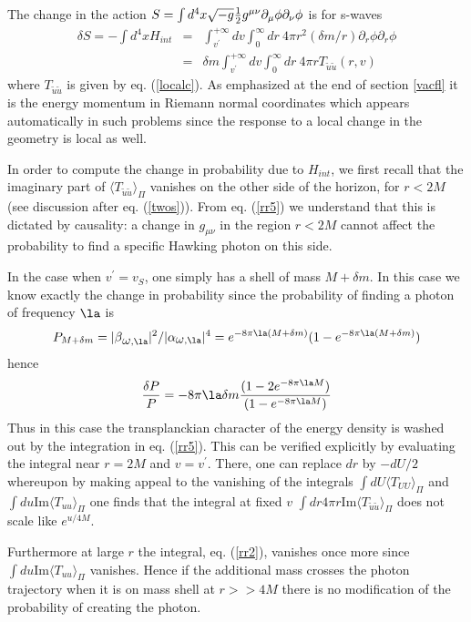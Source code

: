 \documentclass[12pt]{article}
\begin{document}
The change in the action $S=\int d^4x \sqrt{-g} {1\over 2}
g^{\mu\nu} \partial_\mu \phi \partial_\nu \phi$ is for s-waves
\begin{eqnarray}
\delta S = - \int d^4 x H_{int} &=& \int_{v^\prime}^{+\infty}\!dv
\int_0^\infty\!dr \ 4 \pi r^2 (\delta m/r) \partial_r\phi \partial_r\phi
\nonumber\\
&=& \delta m \int_{v^\prime}^{+\infty}\!dv
\int_0^\infty\!dr \ 4 \pi r  T_{\tilde u \tilde u}(r,v)
\label{rr5}\end{eqnarray}
where $ T_{\tilde u \tilde u}$ is given by eq. (\ref{localc}).
As emphasized
at the end of section \ref{vacfl} it is the energy
momentum in Riemann normal coordinates which appears automatically in such
problems since the response to a local change in the geometry is local as
well.

In order to compute the change in probability due to $H_{int}$, we first
recall that the imaginary part of $\langle  T_{\tilde u \tilde u}
\rangle_{\Pi}$ vanishes on
the other side of the horizon, for
$r<2M$ (see discussion after eq. (\ref{twos})). From eq. (\ref{rr5}) we
understand
that this is dictated by causality: a change in $g_{\mu\nu}$ in the region
$r<2M$ cannot affect the probability to find a specific Hawking photon on this
side.

In the case when $v^\prime = v_S$, one simply has a shell of  mass $M+\delta
m$. In this case we know exactly the change in probability since the
probability of finding a photon of frequency $\la$ is \begin{equation}
P_{M+\delta m}
= |\be_{\om,\la}|^2/|\alpha_{\om,\la}|^4
=e^{-8 \pi \la (M+\delta m)} (1 - e^{-8 \pi \la (M+\delta m)})
\end{equation}
hence
\begin{equation}
{\delta P\over P} = -8\pi \la \delta m {(1 - 2e^{-8 \pi \la M})
\over (1 - e^{-8 \pi \la M})}
\end{equation}
Thus in this case the transplanckian character of the energy density is
washed out by the integration in eq. (\ref{rr5}). This can be verified
explicitly by evaluating the integral near $r=2M$ and  $v=v^\prime$.
There, one can
replace $dr$ by $-dU/2$ whereupon by making appeal to the vanishing of the
integrals $\int\! dU\! \langle T_{UU}\rangle_\Pi$ and $\int\! du
\mbox{Im}\langle T_{uu}\rangle_\Pi$ one finds
that the integral at fixed $v$ $\int\!
dr 4 \pi r \mbox{Im}
\langle T_{\tilde u\tilde u} \rangle_\Pi$ does not scale like $e^{u/4M}$.

Furthermore at large $r$ the integral, eq. (\ref{rr2}),
vanishes once more since $\int\! du
\mbox{Im}\langle T_{uu}\rangle_\Pi$ vanishes.
Hence if the additional mass
crosses the photon trajectory when it is on mass shell at $r>>4M$ there is no
modification of the probability of creating the photon.
\end{document}
